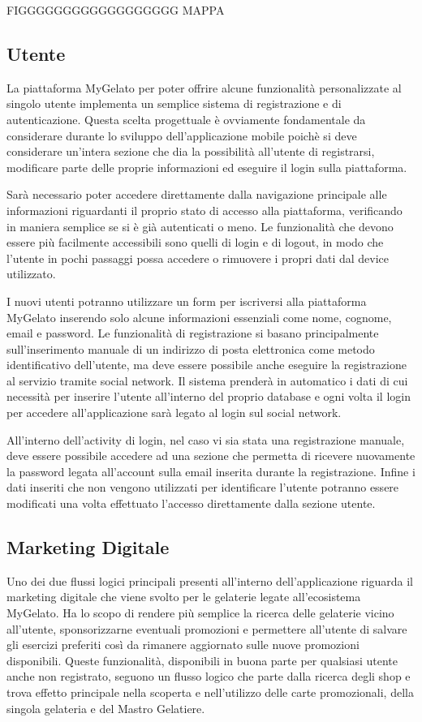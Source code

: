 FIGGGGGGGGGGGGGGGGGG MAPPA

\subsection{Utente}
La piattaforma MyGelato per poter offrire alcune funzionalità personalizzate al singolo utente implementa un semplice sistema di registrazione e di autenticazione.
Questa scelta progettuale è ovviamente fondamentale da considerare durante lo sviluppo dell'applicazione mobile poichè si deve considerare un'intera sezione che dia la possibilità all'utente di registrarsi, modificare parte delle proprie informazioni ed eseguire il login sulla piattaforma.

Sarà necessario poter accedere direttamente dalla navigazione principale alle informazioni riguardanti il proprio stato di accesso alla piattaforma, verificando in maniera semplice se si è già autenticati o meno.
Le funzionalità che devono essere più facilmente accessibili sono quelli di login e di logout, in modo che l'utente in pochi passaggi possa accedere o rimuovere i propri dati dal device utilizzato.

I nuovi utenti potranno utilizzare un form per iscriversi alla piattaforma MyGelato inserendo solo alcune informazioni essenziali come nome, cognome, email e password.
Le funzionalità di registrazione si basano principalmente sull'inserimento manuale di un indirizzo di posta elettronica come metodo identificativo dell'utente, ma deve essere possibile anche eseguire la registrazione al servizio tramite social network.
Il sistema prenderà in automatico i dati di cui necessità per inserire l'utente all'interno del proprio database e ogni volta il login per accedere all'applicazione sarà legato al login sul social network.

All'interno dell'activity di login, nel caso vi sia stata una registrazione manuale, deve essere possibile accedere ad una sezione che permetta di ricevere nuovamente la password legata all'account sulla email inserita durante la registrazione.
Infine i dati inseriti che non vengono utilizzati per identificare l'utente potranno essere modificati una volta effettuato l'accesso direttamente dalla sezione utente.

\subsection{Marketing Digitale}
Uno dei due flussi logici principali presenti all'interno dell'applicazione riguarda il marketing digitale che viene svolto per le gelaterie legate all'ecosistema MyGelato.
Ha lo scopo di rendere più semplice la ricerca delle gelaterie vicino all'utente, sponsorizzarne eventuali promozioni e permettere all'utente di salvare gli esercizi preferiti così da rimanere aggiornato sulle nuove promozioni disponibili.
Queste funzionalità, disponibili in buona parte per qualsiasi utente anche non registrato, seguono un flusso logico che parte dalla ricerca degli shop e trova effetto principale nella scoperta e nell'utilizzo delle carte promozionali, della singola gelateria e del Mastro Gelatiere.

